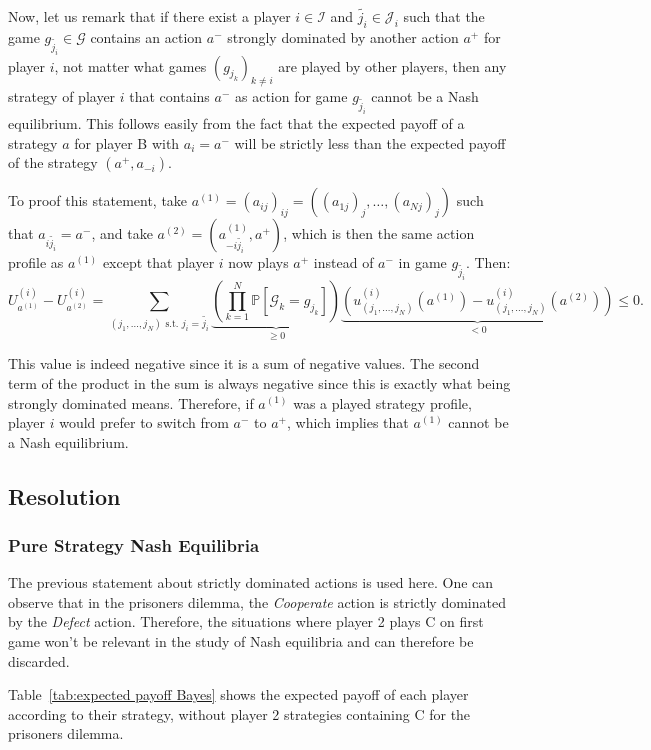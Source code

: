 \documentclass{article}
\renewcommand{\P}{\mathbb P}
\begin{document}
Now, let us remark that if there exist a player $i \in \mathcal I$ and $\widetilde {j_i} \in \mathcal J_i$ such
that the game $g_{\widetilde {j_i}} \in \mathcal G$ contains an action $a^-$ strongly dominated by another action
$a^+$ for player $i$, not matter what games $(g_{j_k})_{k \neq i}$ are played by other players, then any strategy of
player $i$ that contains $a^-$ as action for game $g_{\widetilde {j_i}}$ cannot be a Nash equilibrium.
This follows easily from the fact that the expected payoff of a strategy $a$ for player B with $a_i = a^-$ will
be strictly less than the expected payoff of the strategy $(a^+, a_{-i})$.

To proof this statement, take $a^{(1)} = (a_{ij})_{ij} = ((a_{1j})_j, \ldots, (a_{Nj})_j)$ such that $a_{i\widetilde {j_i}} = a^-$,
and take $a^{(2)} = (a^{(1)}_{-i\widetilde {j_i}}, a^+)$, which is then the same action profile as $a^{(1)}$ except that
player $i$ now plays $a^+$ instead of $a^-$ in game $g_{\widetilde {j_i}}$. Then:
\[U^{(i)}_{a^{(1)}} - U^{(i)}_{a^{(2)}} =
	\sum_{(j_1, \ldots, j_N) \text{ s.t. } j_i = \widetilde {j_i}}
		\underbrace {\left(\prod_{k=1}^N\P[\mathscr G_k=g_{j_k}]\right)}_{\geq 0}
		\underbrace {\left(u^{(i)}_{(j_1, \ldots, j_N)}(a^{(1)}) - u^{(i)}_{(j_1, \ldots, j_N)}(a^{(2)})\right)}_{< 0} \leq 0.
\]

This value is indeed negative since it is a sum of negative values. The second term of the product in the sum is
always negative since this is exactly what being strongly dominated means. Therefore, if $a^{(1)}$ was a played
strategy profile, player $i$ would prefer to switch from $a^-$ to $a^+$, which implies that $a^{(1)}$ cannot
be a Nash equilibrium.

\subsection{Resolution}
\subsubsection{Pure Strategy Nash Equilibria}
The previous statement about strictly dominated actions is used here. One can observe that in the prisoners dilemma,
the \textit{Cooperate} action is strictly dominated by the \textit{Defect} action. Therefore, the situations where
player 2 plays C on first game won't be relevant in the study of Nash equilibria and can therefore be discarded.

Table~\ref{tab:expected payoff Bayes} shows the expected payoff of each player according to their strategy, without
player 2 strategies containing C for the prisoners dilemma.
\end{document}
